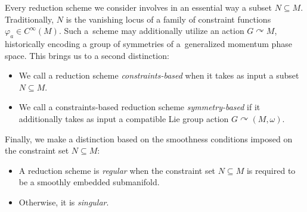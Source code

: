 \documentclass[pdftex]{sigma}
\numberwithin{equation}{section}
\renewcommand{\subset}{\subseteq}
\begin{document}
Every reduction scheme we consider involves in an essential way a subset $N\subset M$. Traditionally, $N$ is the vanishing locus of a family of constraint functions $\varphi_a \in C^\infty(M)$. Such a~scheme may additionally utilize an action $G\curvearrowright M$, historically encoding a group of symmetries of a~generalized momentum phase space. This brings us to a second distinction:
\begin{itemize}\itemsep=0pt
	\item We call a reduction scheme \emph{constraints-based} when it takes as input a subset $N\subset M$.
	\item We call a constraints-based reduction scheme \emph{symmetry-based} if it additionally takes as input a compatible Lie group action $G\curvearrowright (M,\omega)$.
\end{itemize}

Finally, we make a distinction based on the smoothness conditions imposed on the constraint set $N\subset M$:
\begin{itemize}\itemsep=0pt
	\item A reduction scheme is \emph{regular} when the constraint set $N\subset M$ is required to be a smoothly embedded submanifold.
	\item Otherwise, it is \emph{singular}.
\end{itemize}
\end{document}
